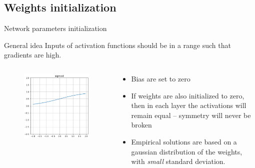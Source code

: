 \documentclass[xcolor=pdftex,dvipsnames,table,mathserif]{beamer}
\begin{document}
\subsection{Weights initialization}


\begin{frame}{Network parameters initialization}

  \begin{block}{General idea}
    Inputs of activation functions should be in a range such that gradients are high.
  \end{block}

  \begin{columns}
    \begin{column}{.3\textwidth}
      \begin{figure}[ht]
        \centering
        \includegraphics[width=\textwidth]{act_sigm.png}
      \end{figure}

    \end{column}

    \begin{column}{.7\textwidth}
      \begin{itemize}
      \item Bias are set to zero
      \item If weights are also initialized to zero, then in each layer the activations will remain equal -- symmetry will never be broken
      \item Empirical solutions are based on a gaussian distribution of the weights, with \textit{small} standard deviation.
      \end{itemize}
    \end{column}
  \end{columns}
\end{frame}
\end{document}
